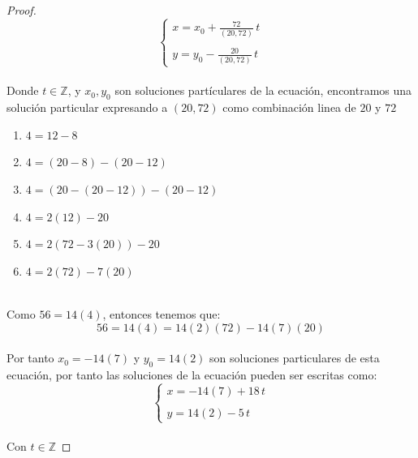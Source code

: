 \documentclass[11pt,letterpaper]{article}
\newcommand{\Z}{\mathbb{Z}}
\begin{document}
\begin{proof}
     \begin{equation*}
        \left\{ \begin{array}{lcc} x=x_0+\frac{72}{(20,72)}\,t\\ \\ y=y_0-\frac{20}{(20,72)}\,t \end{array} \right.
     \end{equation*}\,\\
     Donde $t\in \Z$, y $x_0,y_0$ son soluciones part\'iculares de la ecuaci\'on, encontramos una soluci\'on particular expresando
     a $(20,72)$ como combinaci\'on linea de $20$ y $72$\,\\
     \begin{enumerate}
        \item $4=12-8$
        \item $4=(20-8)-(20-12)$
        \item $4=(20-(20-12))-(20-12)$
        \item $4=2(12)-20$
        \item $4=2(72-3(20))-20$
        \item $4=2(72)-7(20)$
     \end{enumerate}\,\\
     Como $56=14(4)$, entonces tenemos que:\,\\
     \begin{equation*}
        56=14(4)=14(2)(72)-14(7)(20)
     \end{equation*}\,\\
     Por tanto $x_0=-14(7)$ y $y_0=14(2)$ son soluciones particulares de esta ecuaci\'on, por tanto
     las soluciones de la ecuaci\'on pueden ser escritas como:\,\\
     \begin{equation*}
        \left\{ \begin{array}{lcc} x=-14(7)+18\,t\\ \\ y=14(2)-5\,t \end{array} \right.
     \end{equation*}\,\\
Con $t\in \Z$
\end{proof}
\end{document}
